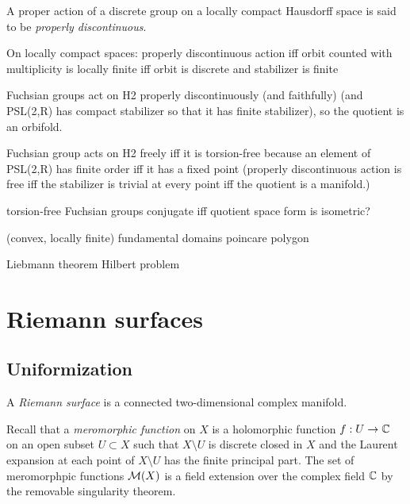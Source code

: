 \documentclass{../../large}
\begin{document}
\begin{prb}

A proper action of a discrete group on a locally compact Hausdorff space is said to be \emph{properly discontinuous}.

On locally compact spaces: properly discontinuous action iff orbit counted with multiplicity is locally finite iff orbit is discrete and stabilizer is finite

Fuchsian groups act on H2 properly discontinuously (and faithfully) (and PSL(2,R) has compact stabilizer so that it has finite stabilizer), so the quotient is an orbifold.

Fuchsian group acts on H2 freely iff it is torsion-free because an element of PSL(2,R) has finite order iff it has a fixed point (properly discontinuous action is free iff the stabilizer is trivial at every point iff the quotient is a manifold.)

torsion-free Fuchsian groups conjugate iff quotient space form is isometric?
\end{prb}

(convex, locally finite) fundamental domains
poincare polygon

\begin{prb}
Liebmann theorem
Hilbert problem
\end{prb}





\part{Riemann surfaces}


\chapter{Uniformization}

\begin{prb}


A \emph{Riemann surface} is a connected two-dimensional complex manifold.
\end{prb}

Recall that a \emph{meromorphic function} on $X$ is a holomorphic function $f:U\to\mathbb{C}$ on an open subset $U\subset X$ such that $X\setminus U$ is discrete closed in $X$ and the Laurent expansion at each point of $X\setminus U$ has the finite principal part.
The set of meromorphpic functions $\mathcal{M}(X)$ is a field extension over the complex field $\mathbb{C}$ by the removable singularity theorem.
\end{document}
